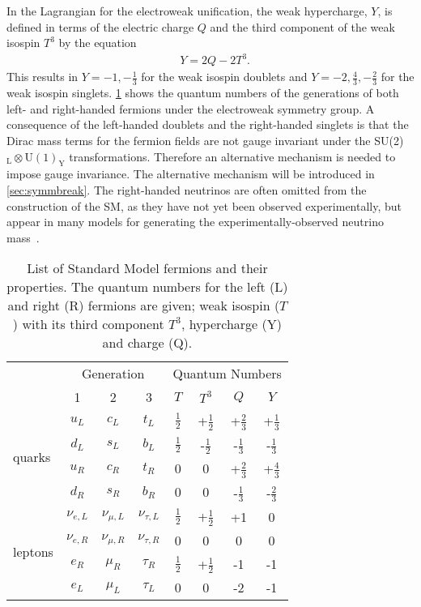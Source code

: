 In the Lagrangian for the electroweak unification, the weak hypercharge, $Y$, is defined in terms of the electric charge $Q$ and the third component of the weak isospin $T^3$ by the equation
\begin{equation}
    \label{eq:hypercharge}
    \begin{aligned}
        & Y = 2Q - 2T^3.
    \end{aligned}
\end{equation}
This results in $Y = -1, -\frac{1}{3}$ for the weak isospin doublets and $Y = -2,\frac{4}{3},-\frac{2}{3}$ for the weak isospin singlets. \cref{tab:fermions} shows the quantum numbers of the generations of both left- and right-handed fermions under the electroweak symmetry group. A consequence of the left-handed doublets and the right-handed singlets is that the Dirac mass terms for the fermion fields are not gauge invariant under the SU(2)$_\mathrm{L} \otimes \mathrm{U}(1)_\mathrm{Y}$ transformations. Therefore an alternative mechanism is needed to impose gauge invariance. The alternative mechanism will be introduced in \cref{sec:symmbreak}. The right-handed neutrinos are often omitted from the construction of the SM, as they have not yet been observed experimentally, but appear in many models for generating the experimentally-observed neutrino mass~\cite{Ahmad2002}.

\begin{table}[htp]
    \centering
    {
    \begin{tabular}{l | c c c | c c c c}
    \toprule
      & \multicolumn{3}{c|}{Generation} &  \multicolumn{4}{c}{Quantum Numbers}  \\
      & 1 & 2 & 3 & $T$ & $T^3$ & $Q$ & $Y$ \\ 
    \hline
    \multirow{4}{*}[0.5em]{quarks} & $u_L$ & $c_L$ & $t_L$ & $\frac{1}{2}$ & +$\frac{1}{2}$ & +$\frac{2}{3}$ & +$\frac{1}{3}$ \\
    & $d_L$ & $s_L$ & $b_L$ & $\frac{1}{2}$ & -$\frac{1}{2}$ & -$\frac{1}{3}$ & -$\frac{1}{3}$ \\
    & $u_R$ & $c_R$ & $t_R$ & $ 0$ & $0$ & +$\frac{2}{3}$ & +$\frac{4}{3}$ \\
    & $d_R$ & $s_R$ & $b_R$ & $ 0$ & $0$ & -$\frac{1}{3}$ & -$\frac{2}{3}$ \\
    \midrule
    \multirow{4}{*}[0.5em]{leptons} & $\nu_{e,L}$ & $\nu_{\mu,L}$ & $\nu_{\tau,L}$ & $\frac{1}{2}$ & +$\frac{1}{2}$ & +1 & 0 \\
    & $\nu_{e,R}$ & $\nu_{\mu,R}$ & $\nu_{\tau,R}$ & 0 & 0 & 0 & 0 \\
        & $e_R$ & $\mu_R$ & $\tau_R$ & $\frac{1}{2}$ & +$\frac{1}{2}$ & -1 & -1 \\
        & $e_L$ & $\mu_L$ & $\tau_L$ & 0 & 0 & -2 & -1 \\
    \bottomrule
    \end{tabular}
    }
    \caption{List of Standard Model fermions and their properties. The quantum numbers for the left (L) and right (R) fermions are given; weak isospin ($T$) with its third component $T^3$, hypercharge (Y) and charge (Q).}
    \label{tab:fermions}
\end{table}

